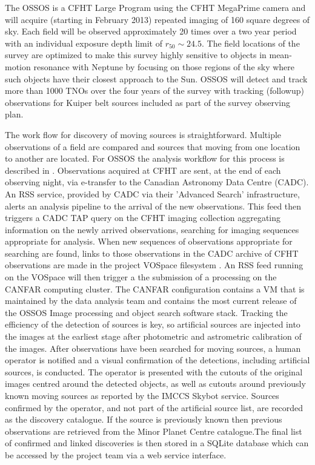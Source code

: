 The OSSOS is a CFHT Large Program using the CFHT MegaPrime camera and will acquire (starting in February 2013) repeated imaging of 160 square degrees of sky.  Each field will be observed approximately 20 times over a two year period with an individual exposure depth limit of $r_{50} \sim 24.5$.  The field locations  of the survey are optimized to make this survey highly sensitive to objects in mean-motion resonance with Neptune by focusing on those regions of the sky where such objects have their closest approach to the Sun. OSSOS will detect and track more than 1000 TNOs over the four years of the survey with tracking (followup) observations for Kuiper belt sources included as part of the survey observing plan.

The work flow for discovery of moving sources is straightforward.  Multiple observations of a field are compared and sources that moving from one location to another are located. For OSSOS the analysis workflow for this process is described in \citet{2004MNRAS.347..471P}. Observations acquired at CFHT are sent, at the end of each observing night, via e-transfer to the Canadian Astronomy Data Centre (CADC).  An RSS service, provided by CADC via their 'Advanced Search' infrastructure, alerts an analysis pipeline to the arrival of the new observations. This feed then triggers a CADC TAP query on the CFHT imaging collection aggregating information on the newly arrived observations, searching for imaging sequences appropriate for analysis.  When new sequences of observations appropriate for searching are found, links to those observations in the CADC archive of CFHT observations are made in the project VOSpace filesystem \citep{2012ASPC..461..367K}. An RSS feed running on the VOSpace will then trigger a the submission of a processing on the CANFAR \citep{2009ASPC..411..185G} computing cluster. The CANFAR configuration contains a VM that is maintained by the data analysis team and contains the most current release of the OSSOS Image processing and object search software stack. Tracking the efficiency of the detection of sources is key, so artificial sources are injected into the images at the earliest stage after photometric and astrometric calibration of the images. After observations have been searched for moving sources, a human operator  is notified and a visual confirmation of the detections, including artificial sources, is conducted. The operator is presented with the cutouts of the original images centred around the detected objects, as well as cutouts around previously known moving sources as reported by the IMCCS Skybot \citep{2006ASPC..351..367B} service. Sources  confirmed by the operator, and not part of the artificial source list, are recorded as the discovery catalogue.  If the source is previously known then previous observations are retrieved from the Minor Planet Centre catalogue.The final list of confirmed and linked discoveries is then stored in a SQLite database which can be accessed by the project team via a web service interface. 


